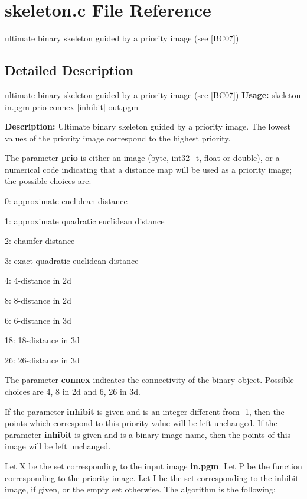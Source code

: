 \section{skeleton.c File Reference}
\label{skeleton_8c}


ultimate binary skeleton guided by a priority image (see [BC07])  




\subsection{Detailed Description}
ultimate binary skeleton guided by a priority image (see [BC07]) {\bfseries Usage:} skeleton in.pgm prio connex [inhibit] out.pgm

{\bfseries Description:} Ultimate binary skeleton guided by a priority image. The lowest values of the priority image correspond to the highest priority.

The parameter {\bfseries prio} is either an image (byte, int32\_\-t, float or double), or a numerical code indicating that a distance map will be used as a priority image; the possible choices are: \begin{DoxyItemize}
\item 0: approximate euclidean distance \item 1: approximate quadratic euclidean distance \item 2: chamfer distance \item 3: exact quadratic euclidean distance \item 4: 4-\/distance in 2d \item 8: 8-\/distance in 2d \item 6: 6-\/distance in 3d \item 18: 18-\/distance in 3d \item 26: 26-\/distance in 3d\end{DoxyItemize}
The parameter {\bfseries connex} indicates the connectivity of the binary object. Possible choices are 4, 8 in 2d and 6, 26 in 3d.

If the parameter {\bfseries inhibit} is given and is an integer different from -\/1, then the points which correspond to this priority value will be left unchanged. If the parameter {\bfseries inhibit} is given and is a binary image name, then the points of this image will be left unchanged.

Let X be the set corresponding to the input image {\bfseries in.pgm}. Let P be the function corresponding to the priority image. Let I be the set corresponding to the inhibit image, if given, or the empty set otherwise. The algorithm is the following:

